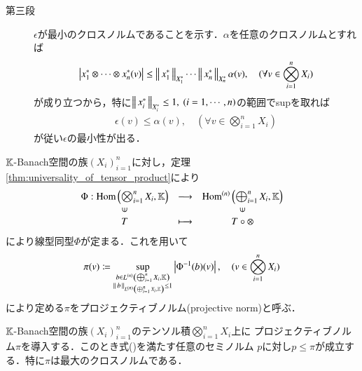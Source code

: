 \begin{prf}
\begin{description}
			\item[第三段]
				$\epsilon$が最小のクロスノルムであることを示す．$\alpha$を任意のクロスノルムとすれば
				\begin{align}
					\left| x_1^* \otimes \cdots \otimes x_n^* (v) \right| 
					\leq \Norm{x_1^*}{X_1^*} \cdots \Norm{x_n^*}{X_n^*} \alpha(v),
					\quad (\forall v \in \bigotimes_{i=1}^n X_i)
				\end{align}
				が成り立つから，特に$\Norm{x_i^*}{X_i^*} \leq 1,\ (i=1,\cdots,n)$の範囲でsupを取れば
				\begin{align}
					\epsilon(v) \leq \alpha(v),
					\quad (\forall v \in \bigotimes_{i=1}^n X_i)
				\end{align}
				が従い$\epsilon$の最小性が出る．
				\QED
		\end{description}
	\end{prf}
	
	\begin{screen}
		\begin{dfn}[プロジェクティブノルム]
			$\K$-Banach空間の族$(X_i)_{i=1}^n$に対し，定理
			\ref{thm:universality_of_tensor_product}により
			\begin{align}
				\begin{array}{ccc}
					\Phi:\Hom{\bigotimes_{i=1}^n X_i}{\K} & \longrightarrow & \Ln{\bigoplus_{i=1}^n X_i}{\K}{n} \\
					\rotatebox{90}{$\in$} & & \rotatebox{90}{$\in$} \\
					T & \longmapsto & T \circ \otimes
					\label{eq:dfn_projective_norm_isomorphism}
				\end{array}
			\end{align}
			により線型同型$\Phi$が定まる．これを用いて
			\begin{align}
				\pi(v) \coloneqq
				\sup{\substack{b \in \ContLn{\bigoplus_{i=1}^n X_i}{\K}{n} \\ \Norm{b}{\ContLn{\bigoplus_{i=1}^n X_i}{\K}{n}} \leq 1}}{\left| \Phi^{-1}(b)(v) \right|},
				\quad (v \in \bigotimes_{i=1}^n X_i)
			\end{align}
			により定める$\pi$をプロジェクティブノルム(projective norm)と呼ぶ．
		\end{dfn}
	\end{screen}
	
	\begin{screen}
		\begin{thm}[プロジェクティブノルムは最大のクロスノルム]
		\label{thm:projective_norm_is_maximum_cross_norm}
			$\K$-Banach空間の族$(X_i)_{i=1}^n$のテンソル積$\bigotimes_{i=1}^n X_i$上に
			プロジェクティブノルム$\pi$を導入する．このとき式()を満たす任意のセミノルム
			$p$に対し$p \leq \pi$が成立する．特に$\pi$は最大のクロスノルムである．
		\end{thm}
	\end{screen}
	
